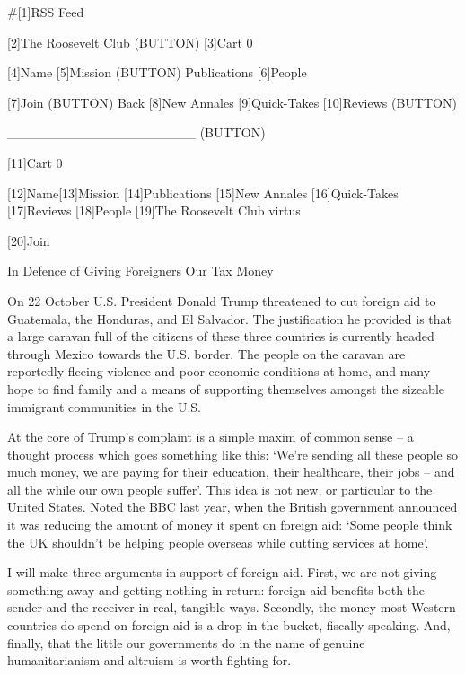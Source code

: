    #[1]RSS Feed

   [2]The Roosevelt Club
   (BUTTON)
   [3]Cart 0

   [4]Name [5]Mission (BUTTON) Publications [6]People

   [7]Join
   (BUTTON) Back [8]New Annales [9]Quick-Takes [10]Reviews
   (BUTTON)

   ____________________ (BUTTON)

   [11]Cart 0

   [12]Name[13]Mission [14]Publications [15]New Annales [16]Quick-Takes
   [17]Reviews [18]People
   [19]The Roosevelt Club
   virtus

   [20]Join

In Defence of Giving Foreigners Our Tax Money

   On 22 October U.S. President Donald Trump threatened to cut foreign aid
   to Guatemala, the Honduras, and El Salvador. The justification he
   provided is that a large caravan full of the citizens of these three
   countries is currently headed through Mexico towards the U.S. border.
   The people on the caravan are reportedly fleeing violence and poor
   economic conditions at home, and many hope to find family and a means
   of supporting themselves amongst the sizeable immigrant communities in
   the U.S.

   At the core of Trump's complaint is a simple maxim of common sense -- a
   thought process which goes something like this: `We're sending all
   these people so much money, we are paying for their education, their
   healthcare, their jobs -- and all the while our own people suffer'.
   This idea is not new, or particular to the United States. Noted the BBC
   last year, when the British government announced it was reducing the
   amount of money it spent on foreign aid: `Some people think the UK
   shouldn't be helping people overseas while cutting services at home'.

   I will make three arguments in support of foreign aid. First, we are
   not giving something away and getting nothing in return: foreign aid
   benefits both the sender and the receiver in real, tangible ways.
   Secondly, the money most Western countries do spend on foreign aid is a
   drop in the bucket, fiscally speaking. And, finally, that the little
   our governments do in the name of genuine humanitarianism and altruism
   is worth fighting for.

